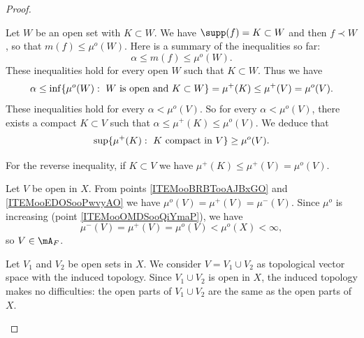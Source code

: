 \begin{proof}
\begin{subproof}
		Let \( W\) be an open set with \( K\subset W\). We have \( \supp(f)=K\subset W\) and then \( f\prec W\), so that $m(f)\leq \mu^o(W)$. Here is a summary of the inequalities so far:
		\begin{equation}
			\alpha\leq m(f)\leq \mu^o(W).
		\end{equation}
		These inequalities hold for every open \( W\) such that \( K\subset W\). Thus we have
		\begin{equation}
			\alpha\leq \inf\{ \mu^o(W):\text{ \( W\) is open and \( K\subset W\)} \} =\mu^+(K) \leq \mu^+(V)= \mu^o(V).
		\end{equation}
		These inequalities hold for every \( \alpha<\mu^o(V)\). So for every \( \alpha<\mu^o(V)\), there exists a compact \( K\subset V\) such that \( \alpha\leq \mu^+(K)\leq \mu^o(V)\). We deduce that
		\begin{equation}
			\sup\{ \mu^+(K):\text{ \( K\) compact in \( V\)} \}\geq \mu^o(V).
		\end{equation}

		For the reverse inequality, if \( K\subset V\) we have \( \mu^+(K)\leq \mu^+(V)=\mu^o(V)\).

		Let \( V\) be open in \( X\). From points \ref{ITEMooBRBTooAJBxGO} and \ref{ITEMooEDOSooPwvyAO} we have \( \mu^o(V)=\mu^+(V)=\mu^-(V)\). Since \( \mu^o\) is increasing (point \ref{ITEMooOMDSooQiYmaP}), we have
		\begin{equation}
			\mu^-(V)=\mu^+(V)=\mu^o(V)<\mu^o(X)<\infty,
		\end{equation}
		so \( V\in\mA_F\).

		        \label{ITEMooLPYWooONCYTi}
		Let \( V_1\) and \( V_2\) be open sets in \( X\). We consider \( V=V_1\cup V_2\) as topological vector space with the induced topology. Since \( V_1\cup V_2\) is open in \( X\), the induced topology makes no difficulties: the open parts of \( V_1\cup V_2\) are the same as the open parts of \( X\).


\end{subproof}
\end{proof}
